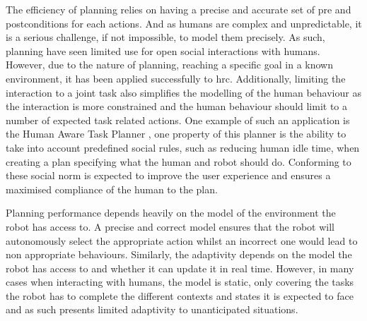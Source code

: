     
    The efficiency of planning relies on having a precise and accurate set of pre and postconditions for each actions. And as humans are complex and unpredictable, it is a serious challenge, if not impossible, to model them precisely. As such, planning have seen limited use for open social interactions with humans. However, due to the nature of planning, reaching a specific goal in a known environment, it has been applied successfully to \gls{hrc}. Additionally, limiting the interaction to a joint task also simplifies the modelling of the human behaviour as the interaction is more constrained and the human behaviour should limit to a number of expected task related actions. One example of such an application is the Human Aware Task Planner \citep{alili2009task}, one property of this planner is the ability to take into account predefined social rules, such as reducing human idle time, when creating a plan specifying what the human and robot should do. Conforming to these social norm is expected to improve the user experience and ensures a maximised compliance of the human to the plan.
    
    Planning performance depends heavily on the model of the environment the robot has access to. A precise and correct model ensures that the robot will autonomously select the appropriate action whilst an incorrect one would lead to non appropriate behaviours. Similarly, the adaptivity depends on the model the robot has access to and whether it can update it in real time. However, in many cases when interacting with humans, the model is static, only covering the tasks the robot has to complete the different contexts and states it is expected to face and as such presents limited adaptivity to unanticipated situations.
    
    
